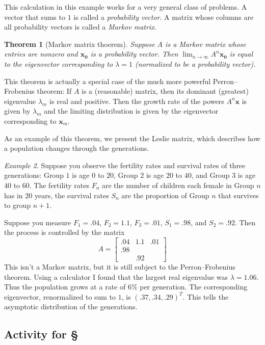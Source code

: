 \documentclass[11pt,oneside]{amsbook}
\theoremstyle{definition}
\theoremstyle{plain}
\newtheorem{theorem}{Theorem}[section]
\theoremstyle{definition}
\theoremstyle{remark}
\newtheorem{example}[theorem]{Example}
\numberwithin{equation}{section}
\numberwithin{figure}{section}
\begin{document}
This calculation in this example works for a very general class of problems. A vector that sums to $1$ is called a \emph{probability vector}. A matrix whose columns are all probability vectors is called a \emph{Markov matrix}.

\begin{theorem}[Markov matrix thoerem]
  Suppose $A$ is a Markov matrix whose entries are nonzero and $\mathbf{x_0}$ is a probability vector. Then $\lim_{n\to\infty}A^n\mathbf{x_0}$ is equal to the eigenvector corresponding to $\lambda=1$ (normalized to be a probability vector).
\end{theorem}

This theorem is actually a special case of the much more powerful Perron--Frobenius theorem: If $A$ is a (reasonable) matrix, then its dominant (greatest) eigenvalue $\lambda_m$ is real and positive. Then the growth rate of the powers $A^n\mathbf{x}$ is given by $\lambda_m$ and the limiting distribution is given by the eigenvector corresponding to  $\mathbf{x}_m$.

As an example of this theorem, we present the Leslie matrix, which describes how a population changes through the generations.
  
\begin{example}
  Suppose you observe the fertility rates and survival rates of three generations: Group $1$ is age $0$ to $20$, Group $2$ is age $20$ to $40$, and Group $3$ is age $40$ to $60$. The fertility rates $F_n$ are the number of children each female in Group $n$ has in $20$ years, the survival rates $S_n$ are the proportion of Group $n$ that survives to group $n+1$.

  Suppose you measure $F_1=.04$, $F_2=1.1$, $F_3=.01$, $S_1=.98$, and $S_2=.92$. Then the process is controlled by the matrix
  \[A=\begin{bmatrix}.04&1.1&.01\\.98\\&.92\end{bmatrix}
  \]
  This isn't a Markov matrix, but it is still subject to the Perron--Frobenius theorem. Using a calculator I found that the largest real eigenvalue was $\lambda=1.06$. Thus the population grows at a rate of 6\% per generation. The corresponding eigenvector, renormalized to sum to $1$, is $(.37,.34,.29)^T$. This tells the asymptotic distribution of the generations.
\end{example}

\newpage
\subsection*{Activity for \S \thesection}
\end{document}
